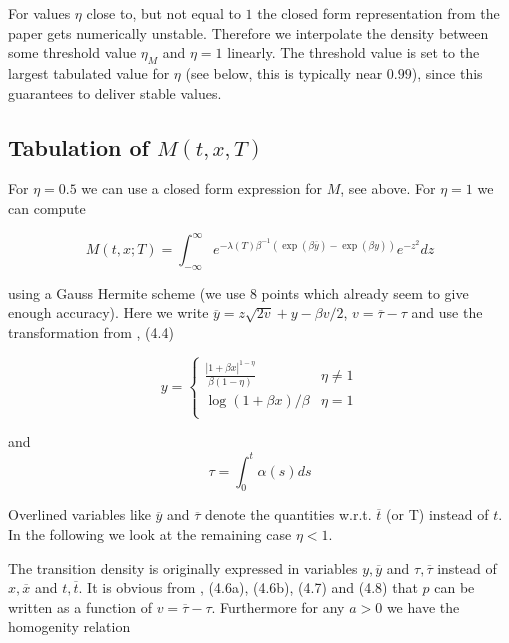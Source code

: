 \documentclass{amsart}
\theoremstyle{plain}
\numberwithin{equation}{section}
\begin{document}
For values $\eta$ close to, but not equal to $1$ the closed form representation from the paper gets numerically unstable. Therefore we interpolate the density between some threshold value $\eta_M$ and $\eta=1$ linearly. The threshold value is set to the largest tabulated value for $\eta$ (see below, this is typically near $0.99$), since this guarantees to deliver stable values.


\subsection{Tabulation of $M(t,x,T)$}

For $\eta=0.5$ we can use a closed form expression for $M$, see above. For $\eta=1$ we can compute

\begin{equation}\label{M_eta_1}
M(t,x;T) = \int_{-\infty}^\infty e^{-\lambda(T)\beta^{-1} (\exp(\beta \overline{y}) - \exp(\beta y))} e^{-z^2} dz
\end{equation}

using a Gauss Hermite scheme (we use $8$ points which already seem to give enough accuracy). Here we write $\overline{y} = z\sqrt{2v} + y - \beta v / 2$, $v=\overline{\tau}-\tau$ and use the transformation from \cite{betaeta}, (4.4)

\begin{equation}
y = \begin{cases}
\frac{|1+\beta x|^{1-\eta}}{\beta(1-\eta)} & \eta\neq 1 \\
\log(1+\beta x)/\beta & \eta=1 \\
\end{cases}
\end{equation}

and
\begin{equation}
\tau = \int_0^{t} \alpha(s) ds
\end{equation}

Overlined variables like $\overline{y}$ and $\overline{\tau}$ denote the quantities w.r.t. $\overline{t}$ (or T) instead of $t$. In the following we look at the remaining case $\eta < 1$.

The transition density is originally expressed in variables $y, \overline{y}$ and $\tau, \overline{\tau}$ instead of $x, \overline{x}$ and $t, \overline{t}$. It is obvious from \cite{betaeta}, (4.6a), (4.6b), (4.7) and (4.8) that $p$ can be written as a function of $v = \overline{\tau}-\tau$. Furthermore for any $a > 0$ we have the homogenity relation
\end{document}
